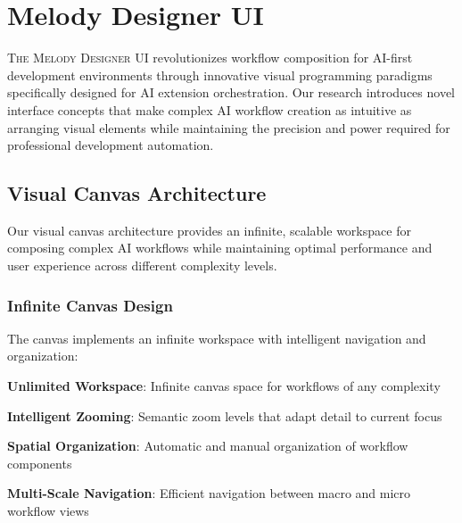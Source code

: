 
\section*{Melody Designer UI}

\lettrine{T}{he Melody Designer UI} revolutionizes workflow composition for AI-first development environments through innovative visual programming paradigms specifically designed for AI extension orchestration. Our research introduces novel interface concepts that make complex AI workflow creation as intuitive as arranging visual elements while maintaining the precision and power required for professional development automation.

\subsection*{Visual Canvas Architecture}

Our visual canvas architecture provides an infinite, scalable workspace for composing complex AI workflows while maintaining optimal performance and user experience across different complexity levels.

\subsubsection*{Infinite Canvas Design}

The canvas implements an infinite workspace with intelligent navigation and organization:

\begin{expandedlist}
    \item \textbf{Unlimited Workspace}: Infinite canvas space for workflows of any complexity
    \item \textbf{Intelligent Zooming}: Semantic zoom levels that adapt detail to current focus
    \item \textbf{Spatial Organization}: Automatic and manual organization of workflow components
    \item \textbf{Multi-Scale Navigation}: Efficient navigation between macro and micro workflow views
\end{expandedlist}

